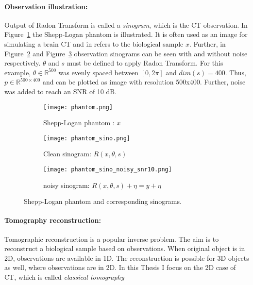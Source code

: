 \paragraph{Observation illustration:}

Output of Radon Transform is called a \textit{sinogram}, which is the CT observation.
In Figure~\ref{fig:phantom} the Shepp-Logan phantom is illustrated.
It is often used as an image for simulating a brain CT and in refers to the biological sample $x$. 
Further, in Figure~\ref{fig:phantom_sinogram} and Figure~\ref{fig:phantom_sinogram_noisy} 
observation sinograms can be seen with and without noise respectively. 
$\theta$ and $s$ must be defined to apply Radon Transform.
For this example, $\theta \in \mathbb{R}^{500}$ was evenly spaced
between $[0, 2 \pi]$ and $dim(s) = 400$. 
Thus, $p \in \mathbb{R}^{500 \times 400}$ and can be plotted as image with resolution 500x400. 
Further, noise was added to reach an SNR of 10 dB.


\begin{figure}[H]
    \captionsetup[subfigure]{justification=centering}
    \centering
    \begin{subfigure}[t]{0.3\textwidth}
        \texttt{[image: phantom.png]}
        \caption{Shepp-Logan phantom : $x$}
        \label{fig:phantom}
    \end{subfigure}\hfill
    \begin{subfigure}[t]{0.3\textwidth}
      \texttt{[image: phantom\_sino.png]}
      \caption{Clean sinogram: $R(x, \theta, s)$}
      \label{fig:phantom_sinogram}
    \end{subfigure}\hfill
    \begin{subfigure}[t]{0.3\textwidth}
      \texttt{[image: phantom\_sino\_noisy\_snr10.png]}
      \caption{noisy sinogram: $R(x, \theta, s) + \eta = y + \eta$}
      \label{fig:phantom_sinogram_noisy}
    \end{subfigure}
    \caption{Shepp-Logan phantom and corresponding sinograms.}
    \label{fig:phantom_and_sinos}
  \end{figure}


\paragraph{Tomography reconstruction:}

Tomographic reconstruction is a popular inverse problem. 
The aim is to reconstruct a biological sample based on observations.
When original object is in 2D, observations are available in 1D. 
The reconstruction is possible for 3D objects as well, where observations are in 2D.
In this Thesis I focus on the 2D case of CT, which is called \textit{classical tomography }


